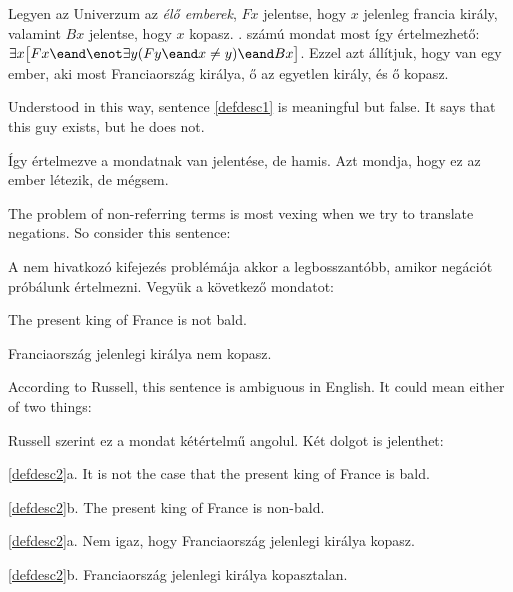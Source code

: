 Legyen az Univerzum az \emph{élő emberek}, $Fx$ jelentse, hogy $x$ jelenleg francia király, valamint $Bx$ jelentse, hogy $x$ kopasz. . számú mondat most így értelmezhető: $\exists x\bigl[Fx \eand \enot\exists y(Fy \eand x\neq y) \eand Bx\bigr]$. Ezzel azt állítjuk, hogy van egy ember, aki most Franciaország királya, ő az egyetlen király, és ő kopasz.

Understood in this way, sentence \ref{defdesc1} is meaningful but false. It says that this guy exists, but he does not.

Így értelmezve a mondatnak van jelentése, de hamis. Azt mondja, hogy ez az ember létezik, de mégsem.

The problem of non-referring terms is most vexing when we try to translate negations. So consider this sentence:

A nem hivatkozó kifejezés problémája akkor a legbosszantóbb, amikor negációt próbálunk értelmezni. Vegyük a következő mondatot:



\begin{earg}
\item[\ex{defdesc2}] The present king of France is not bald.
\end{earg}

\begin{earg}
\item[\ex{defdesc2}] Franciaország jelenlegi királya nem kopasz.
\end{earg}

According to Russell, this sentence is ambiguous in English. It could mean either of two things:

Russell szerint ez a mondat kétértelmű angolul. Két dolgot is jelenthet:

\begin{earg}
\item[\ref{defdesc2}a.] It is not the case that the present king of France is bald.
\item[\ref{defdesc2}b.] The present king of France is non-bald.
\end{earg}

\begin{earg}
\item[\ref{defdesc2}a.] Nem igaz, hogy Franciaország jelenlegi királya kopasz.
\item[\ref{defdesc2}b.] Franciaország jelenlegi királya kopasztalan.
\end{earg}

